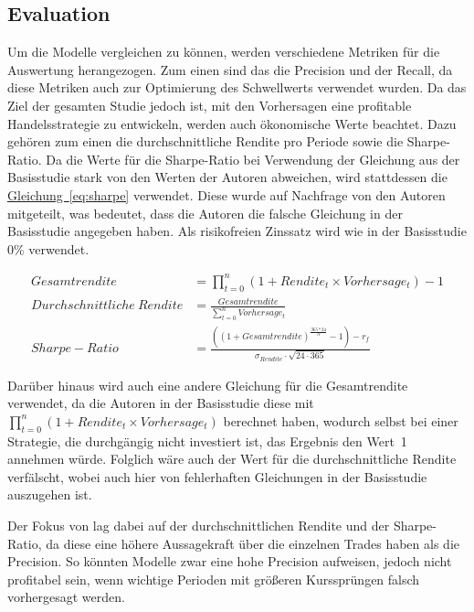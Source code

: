 \documentclass[a4paper, 12pt]{article}
\begin{document}
\subsection{Evaluation} \label{subsec:Evaluation}
Um die Modelle vergleichen zu können, werden verschiedene Metriken für die Auswertung herangezogen.
Zum einen sind das die Precision und der Recall, da diese Metriken auch zur Optimierung des Schwellwerts verwendet wurden.
Da das Ziel der gesamten Studie jedoch ist, mit den Vorhersagen eine profitable Handelsstrategie zu entwickeln, werden auch ökonomische Werte beachtet.
Dazu gehören zum einen die durchschnittliche Rendite pro Periode sowie die Sharpe-Ratio.
Da die Werte für die Sharpe-Ratio bei Verwendung der Gleichung aus der Basisstudie stark von den Werten der Autoren abweichen, wird stattdessen die \hyperref[eq:sharpe]{Gleichung~\ref*{eq:sharpe}} verwendet. 
Diese wurde auf Nachfrage von den Autoren mitgeteilt, was bedeutet, dass die Autoren die falsche Gleichung in der Basisstudie angegeben haben.
Als risikofreien Zinssatz wird wie in der Basisstudie 0\% verwendet.


\begin{align}
	Gesamtrendite &= \prod_{t=0}	^n (1 + Rendite_t \times Vorhersage_t) - 1 \\
	Durchschnittliche\ Rendite &= \frac{Gesamtrendite}{\sum_{t=0}^n Vorhersage_t} \\
	Sharpe-Ratio &= \frac{((1 + Gesamtrendite)^{\frac{365 * 24}{N}} - 1) - r_f}{\sigma_{Rendite} \cdot \sqrt{24 \cdot 365}}
	\label{eq:sharpe}
\end{align}

Darüber hinaus wird auch eine andere Gleichung für die Gesamtrendite verwendet, da die Autoren in der Basisstudie diese mit $\prod_{t=0}^n (1 + Rendite_t \times Vorhersage_t)$ berechnet haben, wodurch selbst bei einer Strategie, die durchgängig nicht investiert ist, das Ergebnis den Wert~1 annehmen würde.
Folglich wäre auch der Wert für die durchschnittliche Rendite verfälscht, wobei auch hier von fehlerhaften Gleichungen in der Basisstudie auszugehen ist.
\vspace{\baselineskip}

Der Fokus von \textcite{Goutte2023} lag dabei auf der durchschnittlichen Rendite und der Sharpe-Ratio, da diese eine höhere Aussagekraft über die einzelnen Trades haben als die Precision.
So könnten Modelle zwar eine hohe Precision aufweisen, jedoch nicht profitabel sein, wenn wichtige Perioden mit größeren Kurssprüngen falsch vorhergesagt werden.
\end{document}
